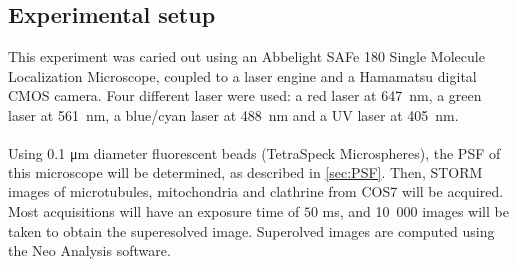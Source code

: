 \subsection{Experimental setup} \label{sec:experimental_setup}
This experiment was caried out using an Abbelight SAFe 180 Single Molecule Localization Microscope, coupled to a laser engine and a Hamamatsu digital CMOS camera. Four different laser were used: a red laser at \mbox{647 nm}, a green laser at \mbox{561 nm}, a blue/cyan laser at \mbox{488 nm} and a UV laser at \mbox{405 nm}.

Using 0.1 \si{\micro\meter} diameter fluorescent beads (TetraSpeck\textsuperscript{\texttrademark} Microspheres), the PSF of this microscope will be determined, as described in \autoref{sec:PSF}. Then, STORM images of microtubules, mitochondria and clathrine from COS7 will be acquired. Most acquisitions will have an exposure time of $50$ ms, and \mbox{10 000} images will be taken to obtain the superesolved image. Superolved images are computed using the Neo Analysis software.


